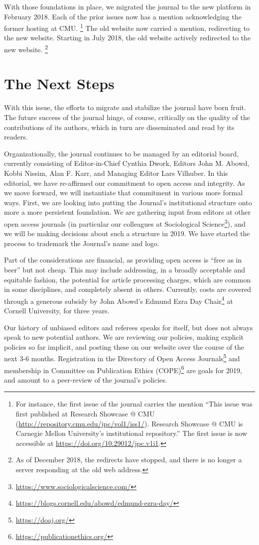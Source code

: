 \documentclass{jpcfinal} %
\newcommand{\urlcite}[2]{#2\footnote{\url{#1}}}
\begin{document}
With those foundations in place, we migrated the journal to the new platform in February 2018. 
Each of the prior issues now has a mention acknowledging the former hosting at CMU.%
\footnote{
	For instance, the first issue of the journal carries the mention ``This issue was first published at Research Showcase @ CMU (\url{http://repository.cmu.edu/jpc/vol1/iss1/}). Research Showcase @ CMU is Carnegie Mellon University's institutional repository.'' The first issue is now accessible at \url{https://doi.org/10.29012/jpc.v1i1}.}
The old website now carried a mention, redirecting to the new website. Starting in July 2018, the old website actively redirected to the new website.%
\footnote{As of December 2018, the redirects have stopped, and there is no longer a server responding at the old web address.} 


\section{The Next Steps}

With this issue, the efforts to migrate and stabilize the journal have born fruit. The future success of the journal hinge, of course, critically on the quality of the contributions of its authors, which in turn are disseminated and read by its readers.

Organizationally, the journal continues to be managed by an editorial board, currently consisting of Editor-in-Chief 
Cynthia Dwork, Editors 
John M. Abowd, 
Kobbi Nissim, 
Alan F. Karr, and 
Managing Editor
Lars Vilhuber. In this editorial, we have re-affirmed our commitment to open access and integrity. As we move forward, we will instantiate that commitment in various more formal ways. First, we are looking into putting the Journal's institutional structure onto more a more persistent foundation. We are gathering  input from editors at other open access journals (in particular our colleagues at \urlcite{https://www.sociologicalscience.com/}{Sociological Science}), and we will be making decisions about such a structure in 2019. We have started the process to trademark the Journal's name and logo.

Part of the considerations are financial, as providing open access is ``free as in beer'' but not cheap. This may include addressing, in a broadly acceptable and equitable fashion, the potential for article processing charges, which are common in some disciplines, and completely absent in others. Currently, costs are covered through a generous subsidy by John Abowd's 
 \urlcite{https://blogs.cornell.edu/abowd/edmund-ezra-day/}{Edmund Ezra Day Chair}  at Cornell University, for three years. 
 
Our history of unbiased editors and referees speaks for itself, but does not always speak to new potential authors. We are reviewing our policies, making explicit policies so far implicit, and posting these on our website over the course of the next 3-6 months. Registration in the \urlcite{https://doaj.org/}{Directory of Open Access Journals} and membership in \urlcite{https://publicationethics.org/}{Committee on Publication Ethics (COPE)} are goals for 2019, and amount to a peer-review of the journal's policies. 




\end{document}
